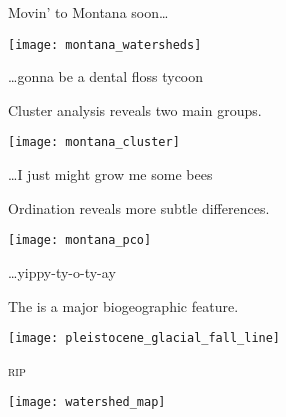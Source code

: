 \documentclass[t]{beamer}
\begin{document}

\begin{frame}[t]{Movin’ to Montana soon\dots}

	\texttt{[image: montana\_watersheds]}
	
	\vfilll
	
	\hfill \tiny \textcolor{gray!60!white}{\dots gonna be a dental floss tycoon}
\end{frame}
%

\begin{frame}[t]{Cluster analysis reveals two main groups.}

	\texttt{[image: montana\_cluster]}

	\vfilll

\hfill \tiny \textcolor{gray!60!white}{\dots I just might grow me some bees}

\end{frame}
%
\begin{frame}[t]{Ordination reveals more subtle differences.}

	\texttt{[image: montana\_pco]}

	\vfilll

	\hfill \tiny \textcolor{gray!60!white}{\dots yippy-ty-o-ty-ay}

\end{frame}
%
\begin{frame}[t]{The  is a major biogeographic feature.}

\texttt{[image: pleistocene\_glacial\_fall\_line]}

\vfilll

\hfill \tiny \textcolor{gray!60!white}{\textsc{rip}}

\end{frame}
%
{
\begin{frame}[b]{}
	
\end{frame}
}
%
\begin{frame}[t]{}
	
	\texttt{[image: watershed\_map]}
	
\end{frame}
\end{document}
